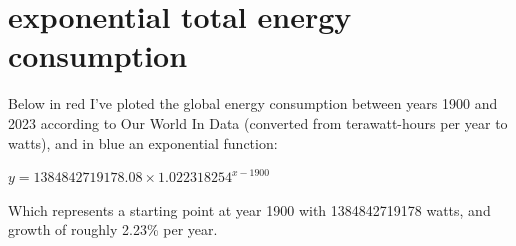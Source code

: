 \documentclass{article}
\begin{document}
	\pagebreak
	
	\section{exponential total energy consumption}
	
	Below in red I've ploted the global energy consumption between years 1900 and 2023 according to Our World In Data (converted from terawatt-hours per year to watts), and in blue an exponential function:
	
	\begin{center}
		{\large $ y = 1384842719178.08 \times 1.022318254^{x-1900} $}
	\end{center}
	
	\noindent Which represents a starting point at year 1900 with 1384842719178 watts, and growth of roughly 2.23\% per year.
	
	\medskip
	
\end{document}
